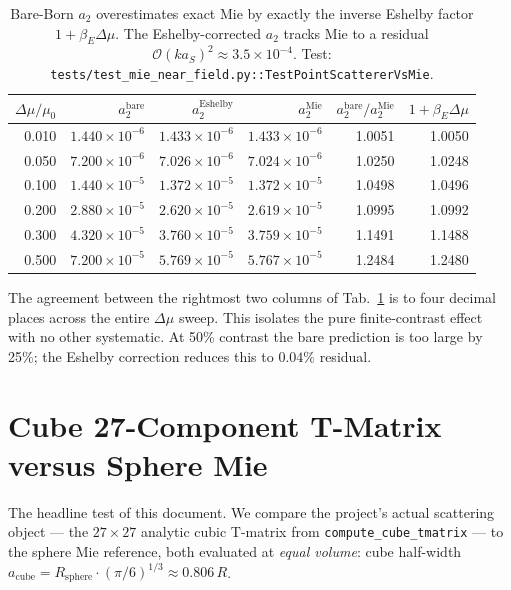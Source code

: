 \documentclass[11pt,a4paper]{article}
\newcommand{\D}{\Delta}
\newcommand{\order}{\mathcal{O}}
\newcommand{\Eshelby}{\mathrm{Eshelby}}
\newcommand{\Mie}{\mathrm{Mie}}
\newcommand{\bare}{\mathrm{bare}}
\newcommand{\code}[1]{\texttt{#1}}
\begin{document}
\begin{table}[h]
\centering
\begin{tabular}{rrrrrr}
\toprule
$\D\mu/\mu_0$ & $a_2^{\bare}$ & $a_2^{\Eshelby}$ & $a_2^{\Mie}$ &
$a_2^{\bare}/a_2^{\Mie}$ & $1+\beta_E\D\mu$ \\
\midrule
0.010 & $1.440\times10^{-6}$ & $1.433\times10^{-6}$ & $1.433\times10^{-6}$ & 1.0051 & 1.0050 \\
0.050 & $7.200\times10^{-6}$ & $7.026\times10^{-6}$ & $7.024\times10^{-6}$ & 1.0250 & 1.0248 \\
0.100 & $1.440\times10^{-5}$ & $1.372\times10^{-5}$ & $1.372\times10^{-5}$ & 1.0498 & 1.0496 \\
0.200 & $2.880\times10^{-5}$ & $2.620\times10^{-5}$ & $2.619\times10^{-5}$ & 1.0995 & 1.0992 \\
0.300 & $4.320\times10^{-5}$ & $3.760\times10^{-5}$ & $3.759\times10^{-5}$ & 1.1491 & 1.1488 \\
0.500 & $7.200\times10^{-5}$ & $5.769\times10^{-5}$ & $5.767\times10^{-5}$ & 1.2484 & 1.2480 \\
\bottomrule
\end{tabular}
\caption{Bare-Born $a_2$ overestimates exact Mie by exactly the inverse
Eshelby factor $1+\beta_E\D\mu$.  The Eshelby-corrected $a_2$ tracks
Mie to a residual $\order{(ka_S)^2}\approx 3.5\times 10^{-4}$.  Test:
\code{tests/test\_mie\_near\_field.py::TestPointScattererVsMie}.}
\label{tab:bare-vs-eshelby}
\end{table}

The agreement between the rightmost two columns of
Tab.~\ref{tab:bare-vs-eshelby} is to four decimal places across the
entire $\D\mu$ sweep.  This isolates the pure finite-contrast effect
with no other systematic.  At 50\% contrast the bare prediction is too
large by 25\%; the Eshelby correction reduces this to $0.04\%$ residual.

\section{Cube 27-Component T-Matrix versus Sphere Mie}
\label{sec:cube-vs-mie}

The headline test of this document.  We compare the project's actual
scattering object --- the $27\times 27$ analytic cubic T-matrix from
\code{compute\_cube\_tmatrix} --- to the sphere Mie reference, both
evaluated at \emph{equal volume}: cube half-width
$a_{\mathrm{cube}} = R_{\mathrm{sphere}}\cdot(\pi/6)^{1/3}\approx 0.806\,R$.
\end{document}

